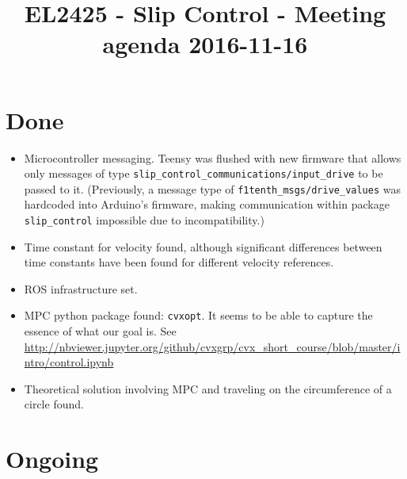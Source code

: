 \documentclass[oneside,12pt]{article}
\title{EL2425 - Slip Control - Meeting agenda 2016-11-16}
\begin{document}
\maketitle

\section{Done}

\begin{itemize}
  \item Microcontroller messaging. Teensy was flushed with new firmware that
    allows only messages of type \texttt{slip\_control\_communications/input\_drive}
    to be passed to it. (Previously, a message type of \texttt{f1tenth\_msgs/drive\_values}
    was hardcoded into Arduino's firmware, making communication within package
    \texttt{slip\_control} impossible due to incompatibility.)
  \item Time constant for velocity found, although significant differences
    between time constants have been found for different velocity references.
  \item ROS infrastructure set.
  \item MPC python package found: \texttt{cvxopt}. It seems to be able to
    capture the essence of what our goal is.
    See \url{http://nbviewer.jupyter.org/github/cvxgrp/cvx_short_course/blob/master/intro/control.ipynb}
  \item Theoretical solution involving MPC and traveling on the circumference
    of a circle found.

\end{itemize}



\section{Ongoing}
\end{document}
